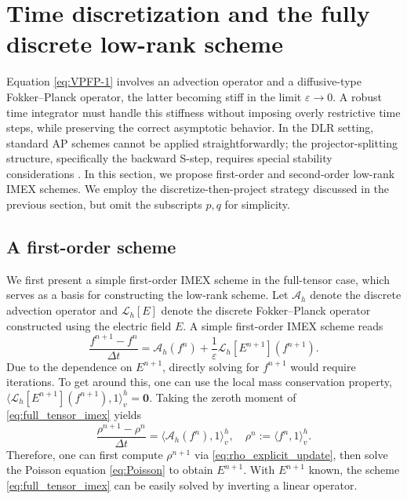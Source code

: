 \documentclass[]{article}
\numberwithin{equation}{section}
\begin{document}
\section{Time discretization and the fully discrete low-rank scheme}
\label{sec:time_discretization}

Equation \eqref{eq:VPFP-1} involves an advection operator and a diffusive-type Fokker--Planck operator, the latter becoming stiff in the limit $\varepsilon \to 0$.
A robust time integrator must handle this stiffness without imposing overly restrictive time steps, while preserving the correct asymptotic behavior.
In the DLR setting, standard AP schemes cannot be applied straightforwardly;
the projector-splitting structure, specifically the backward S-step, requires special stability considerations \cite{zhang2025stability}.
In this section, we propose first-order and second-order low-rank IMEX schemes.
We employ the discretize-then-project strategy discussed in the previous section, but omit the subscripts $p,q$ for simplicity.

\subsection{A first-order scheme}
\label{sec:first_order_schemes}


We first present a simple first-order IMEX scheme in the full-tensor case, which serves as a basis for constructing the low-rank scheme. Let $\mathcal{A}_h$ denote the discrete advection operator and $\mathcal{L}_h[E]$ denote the discrete Fokker--Planck operator constructed using the electric field $E$. A simple first-order IMEX scheme reads
\begin{equation}\label{eq:full_tensor_imex}
  \frac{f^{n+1} - f^{n}}{\Delta t} = \mathcal{A}_h(f^{n}) + \frac{1}{\varepsilon}\mathcal{L}_h[E^{n+1}](f^{n+1}).
\end{equation}
Due to the dependence on $E^{n+1}$, directly solving for $f^{n+1}$ would require iterations. To get around this, one can use the local mass conservation property, $\langle \mathcal{L}_h[E^{n+1}](f^{n+1}), 1 \rangle_v^h = \mathbf{0}$. Taking the zeroth moment of \eqref{eq:full_tensor_imex} yields 
\begin{equation}\label{eq:rho_explicit_update}
  \frac{\rho^{n+1} - \rho^n}{\Delta t} = \langle \mathcal{A}_h(f^n), 1 \rangle_v^h, \quad \rho^n := \langle f^n, 1 \rangle_v^h.
\end{equation}
Therefore, one can first compute $\rho^{n+1}$ via \eqref{eq:rho_explicit_update}, then solve the Poisson equation \eqref{eq:Poisson} to obtain $E^{n+1}$. With $E^{n+1}$ known, the scheme \eqref{eq:full_tensor_imex} can be easily solved by inverting a linear operator.
\end{document}
